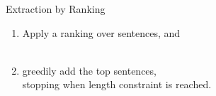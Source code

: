 \documentclass[xcolor={table}]{beamer}
\begin{document}
\begin{frame}{
      }
\begin{figure}[!h]
 \end{figure}
\end{frame}

\begin{frame}{Extraction by Ranking}
    \begin{enumerate}
        \item Apply a ranking over sentences, and 
            ~\\
            ~\\
        \item greedily add the top sentences,\\
            stopping when length
            constraint is reached.
    \end{enumerate}

    


\end{frame}
\end{document}
